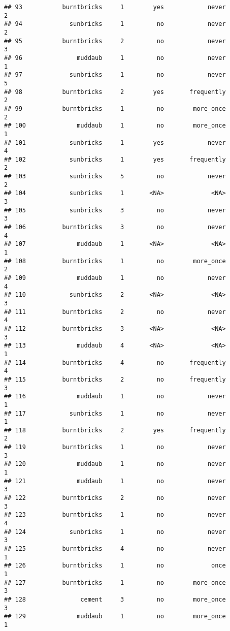 \documentclass[
]{article}
\begin{document}
\begin{verbatim}
## 93           burntbricks     1        yes            never         2
## 94             sunbricks     1         no            never         2
## 95           burntbricks     2         no            never         3
## 96               muddaub     1         no            never         1
## 97             sunbricks     1         no            never         5
## 98           burntbricks     2        yes       frequently         2
## 99           burntbricks     1         no        more_once         2
## 100              muddaub     1         no        more_once         1
## 101            sunbricks     1        yes            never         4
## 102            sunbricks     1        yes       frequently         2
## 103            sunbricks     5         no            never         2
## 104            sunbricks     1       <NA>             <NA>         3
## 105            sunbricks     3         no            never         3
## 106          burntbricks     3         no            never         4
## 107              muddaub     1       <NA>             <NA>         1
## 108          burntbricks     1         no        more_once         2
## 109              muddaub     1         no            never         4
## 110            sunbricks     2       <NA>             <NA>         3
## 111          burntbricks     2         no            never         4
## 112          burntbricks     3       <NA>             <NA>         3
## 113              muddaub     4       <NA>             <NA>         1
## 114          burntbricks     4         no       frequently         4
## 115          burntbricks     2         no       frequently         3
## 116              muddaub     1         no            never         1
## 117            sunbricks     1         no            never         1
## 118          burntbricks     2        yes       frequently         2
## 119          burntbricks     1         no            never         3
## 120              muddaub     1         no            never         1
## 121              muddaub     1         no            never         3
## 122          burntbricks     2         no            never         3
## 123          burntbricks     1         no            never         4
## 124            sunbricks     1         no            never         3
## 125          burntbricks     4         no            never         1
## 126          burntbricks     1         no             once         1
## 127          burntbricks     1         no        more_once         3
## 128               cement     3         no        more_once         3
## 129              muddaub     1         no        more_once         1

\end{verbatim}
\end{document}
